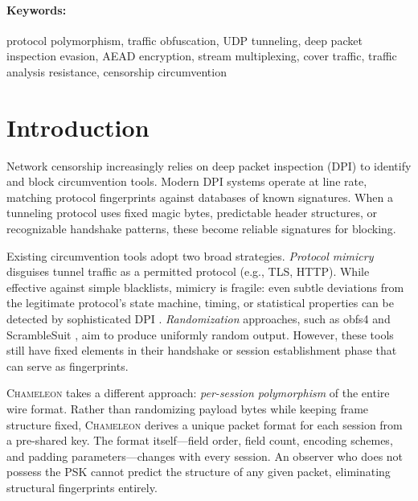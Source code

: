\documentclass[11pt,a4paper]{article}
\let\oldparagraph\paragraph
\renewcommand{\paragraph}[1]{\needspace{5\baselineskip}\oldparagraph{#1}}
\newcommand{\chameleon}{\textsc{Chameleon}}
\begin{document}
\paragraph{Keywords:} protocol polymorphism, traffic obfuscation, UDP tunneling, deep packet inspection evasion, AEAD encryption, stream multiplexing, cover traffic, traffic analysis resistance, censorship circumvention

\section{Introduction}\label{sec:intro}

Network censorship increasingly relies on deep packet inspection (DPI) to identify and block circumvention tools. Modern DPI systems operate at line rate, matching protocol fingerprints against databases of known signatures. When a tunneling protocol uses fixed magic bytes, predictable header structures, or recognizable handshake patterns, these become reliable signatures for blocking.

Existing circumvention tools adopt two broad strategies. \emph{Protocol mimicry} disguises tunnel traffic as a permitted protocol (e.g., TLS, HTTP). While effective against simple blacklists, mimicry is fragile: even subtle deviations from the legitimate protocol's state machine, timing, or statistical properties can be detected by sophisticated DPI \cite{wang2012censorspoofer}. \emph{Randomization} approaches, such as obfs4 \cite{obfs4spec} and ScrambleSuit \cite{winter2013scramblesuit}, aim to produce uniformly random output. However, these tools still have fixed elements in their handshake or session establishment phase that can serve as fingerprints.

\chameleon{} takes a different approach: \emph{per-session polymorphism} of the entire wire format. Rather than randomizing payload bytes while keeping frame structure fixed, \chameleon{} derives a unique packet format for each session from a pre-shared key. The format itself---field order, field count, encoding schemes, and padding parameters---changes with every session. An observer who does not possess the PSK cannot predict the structure of any given packet, eliminating structural fingerprints entirely.
\end{document}

